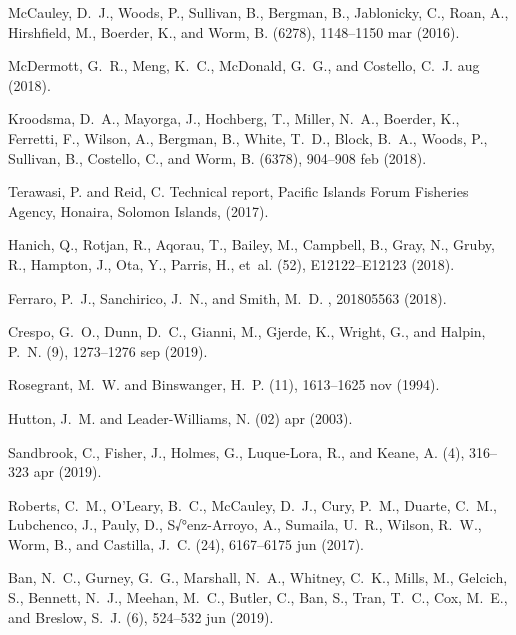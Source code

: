 \documentclass[12pt]{article}
\begin{document}
\begin{thebibliography}{10}
{McCauley}, D.~J., Woods, P., Sullivan, B., Bergman, B., Jablonicky, C., Roan,
  A., Hirshfield, M., Boerder, K., and Worm, B.
(6278), 1148--1150 mar  (2016).

{McDermott}, G.~R., Meng, K.~C., {McDonald}, G.~G., and Costello, C.~J.
 aug  (2018).

Kroodsma, D.~A., Mayorga, J., Hochberg, T., Miller, N.~A., Boerder, K.,
  Ferretti, F., Wilson, A., Bergman, B., White, T.~D., Block, B.~A., Woods, P.,
  Sullivan, B., Costello, C., and Worm, B.
(6378), 904--908 feb  (2018).

Terawasi, P. and Reid, C.
\newblock Technical report, Pacific Islands Forum Fisheries Agency, Honaira,
  Solomon Islands,  (2017).

Hanich, Q., Rotjan, R., Aqorau, T., Bailey, M., Campbell, B., Gray, N., Gruby,
  R., Hampton, J., Ota, Y., Parris, H., et~al.
(52),
  E12122--E12123 (2018).

Ferraro, P.~J., Sanchirico, J.~N., and Smith, M.~D.
,
  201805563 (2018).

Crespo, G.~O., Dunn, D.~C., Gianni, M., Gjerde, K., Wright, G., and Halpin,
  P.~N.
(9), 1273--1276 sep  (2019).

Rosegrant, M.~W. and Binswanger, H.~P.
(11), 1613--1625 nov  (1994).

Hutton, J.~M. and Leader-Williams, N.
(02) apr  (2003).

Sandbrook, C., Fisher, J., Holmes, G., Luque-Lora, R., and Keane, A.
(4), 316--323 apr  (2019).

Roberts, C.~M., O'Leary, B.~C., {McCauley}, D.~J., Cury, P.~M., Duarte, C.~M.,
  Lubchenco, J., Pauly, D., S√°enz-Arroyo, A., Sumaila, U.~R., Wilson,
  R.~W., Worm, B., and Castilla, J.~C.
(24), 6167--6175 jun  (2017).

Ban, N.~C., Gurney, G.~G., Marshall, N.~A., Whitney, C.~K., Mills, M., Gelcich,
  S., Bennett, N.~J., Meehan, M.~C., Butler, C., Ban, S., Tran, T.~C., Cox,
  M.~E., and Breslow, S.~J.
(6), 524--532 jun  (2019).


\end{thebibliography}
\end{document}
